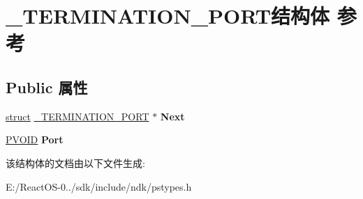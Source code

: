 \hypertarget{struct___t_e_r_m_i_n_a_t_i_o_n___p_o_r_t}{}\section{\+\_\+\+T\+E\+R\+M\+I\+N\+A\+T\+I\+O\+N\+\_\+\+P\+O\+R\+T结构体 参考}
\label{struct___t_e_r_m_i_n_a_t_i_o_n___p_o_r_t}
\subsection*{Public 属性}
\begin{DoxyCompactItemize}
\item 
\mbox{\label{struct___t_e_r_m_i_n_a_t_i_o_n___p_o_r_t_a2b54259d9f9b10044788e2b0c37e52d7}} 
\hyperlink{interfacestruct}{struct} \hyperlink{struct___t_e_r_m_i_n_a_t_i_o_n___p_o_r_t}{\+\_\+\+T\+E\+R\+M\+I\+N\+A\+T\+I\+O\+N\+\_\+\+P\+O\+RT} $\ast$ {\bfseries Next}
\item 
\mbox{\label{struct___t_e_r_m_i_n_a_t_i_o_n___p_o_r_t_a9a8492cedf1666bee535f4970d09e392}} 
\hyperlink{interfacevoid}{P\+V\+O\+ID} {\bfseries Port}
\end{DoxyCompactItemize}


该结构体的文档由以下文件生成\+:\begin{DoxyCompactItemize}
\item 
E\+:/\+React\+O\+S-\/0../sdk/include/ndk/pstypes.\+h\end{DoxyCompactItemize}
